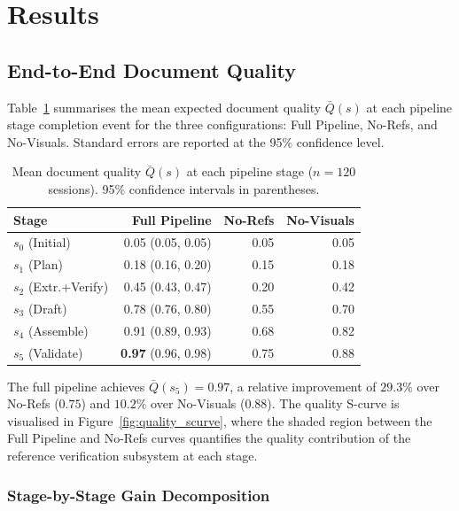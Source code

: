 \section{Results}
\label{sec:results}

\subsection{End-to-End Document Quality}

Table~\ref{tab:quality} summarises the mean expected document quality $\bar{Q}(s)$
at each pipeline stage completion event for the three configurations: Full Pipeline,
No-Refs, and No-Visuals.
Standard errors are reported at the 95\% confidence level.

\begin{table}[h!]
\centering
\caption{Mean document quality $\bar{Q}(s)$ at each pipeline stage ($n=120$ sessions).
         95\% confidence intervals in parentheses.}
\label{tab:quality}
\begin{tabular}{lrrr}
\toprule
Stage & Full Pipeline & No-Refs & No-Visuals \\
\midrule
$s_0$ (Initial)        & 0.05 (0.05, 0.05) & 0.05 & 0.05 \\
$s_1$ (Plan)           & 0.18 (0.16, 0.20) & 0.15 & 0.18 \\
$s_2$ (Extr.+Verify)   & 0.45 (0.43, 0.47) & 0.20 & 0.42 \\
$s_3$ (Draft)          & 0.78 (0.76, 0.80) & 0.55 & 0.70 \\
$s_4$ (Assemble)       & 0.91 (0.89, 0.93) & 0.68 & 0.82 \\
$s_5$ (Validate)       & \textbf{0.97} (0.96, 0.98) & 0.75 & 0.88 \\
\bottomrule
\end{tabular}
\end{table}

The full pipeline achieves $\bar{Q}(s_5)=0.97$, a relative improvement of
$29.3\%$ over No-Refs ($0.75$) and $10.2\%$ over No-Visuals ($0.88$).
The quality S-curve is visualised in Figure~\ref{fig:quality_scurve}, where the
shaded region between the Full Pipeline and No-Refs curves quantifies the quality
contribution of the reference verification subsystem at each stage.



\subsubsection*{Stage-by-Stage Gain Decomposition}

